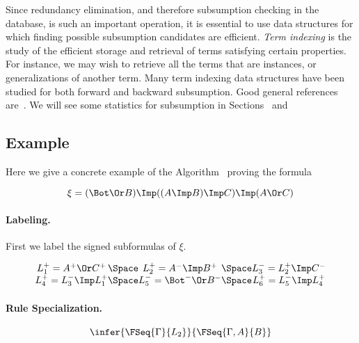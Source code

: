 Since redundancy elimination, and therefore subsumption checking in
the database, is such an important operation, it is essential to use
data structures for which finding possible subsumption candidates are
efficient.  \emph{Term indexing} is the study of the efficient storage
and retrieval of terms satisfying certain properties.  For instance,
we may wish to retrieve all the terms that are instances, or
generalizations of another term.  Many term indexing data structures
have been studied for both forward and backward subsumption.  Good
general references
are~\cite{Graf.1996.TermIndexing,Voronkov.2001.Indexing}.
We will see some statistics for subsumption in Sections~
and~

\subsection{Example}

Here we give a concrete example of the
Algorithm~ proving the formula

\[
\xi = (\Bot \Or B) \Imp ((A \Imp B) \Imp C) \Imp (A \Or C)
\]

\paragraph{Labeling.}

First we label the signed subformulas of $\xi$.

\[
\begin{array}{c@{\Space}c@{\Space}c}
L_1^+ = A^+ \Or C^+ & L_2^+ = A^- \Imp B^+ & L_3^- = L_2^+ \Imp C^- \\
L_4^+ = L_3^- \Imp L_1^+ & L_5^- = \Bot^- \Or B^- & L_6^+ = L_5^- \Imp L_4^+
\end{array}
\]

\paragraph{Rule Specialization.}


\[
\infer{\FSeq{\Gamma}{L_2}}{\FSeq{\Gamma, A}{B}}
\]

